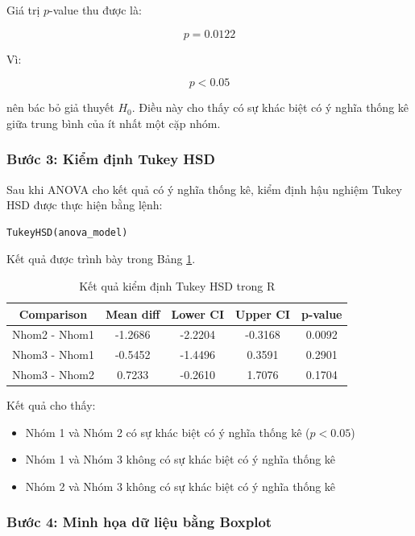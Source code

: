 Giá trị $p$-value thu được là:

\[
p = 0.0122
\]

Vì:

\[
p < 0.05
\]

nên bác bỏ giả thuyết $H_0$. Điều này cho thấy có sự khác biệt có ý nghĩa
thống kê giữa trung bình của ít nhất một cặp nhóm.

\subsubsection*{Bước 3: Kiểm định Tukey HSD}

Sau khi ANOVA cho kết quả có ý nghĩa thống kê, kiểm định hậu nghiệm
Tukey HSD được thực hiện bằng lệnh:

\begin{verbatim}
TukeyHSD(anova_model)
\end{verbatim}

Kết quả được trình bày trong Bảng \ref{tab:r_tukey}.

\begin{table}[!htp]
\centering
\caption{Kết quả kiểm định Tukey HSD trong R}
\label{tab:r_tukey}
\begin{tabular}{|c|c|c|c|c|}
\hline
Comparison & Mean diff & Lower CI & Upper CI & p-value \\
\hline
Nhom2 - Nhom1 & -1.2686 & -2.2204 & -0.3168 & 0.0092 \\
Nhom3 - Nhom1 & -0.5452 & -1.4496 & 0.3591 & 0.2901 \\
Nhom3 - Nhom2 & 0.7233 & -0.2610 & 1.7076 & 0.1704 \\
\hline
\end{tabular}
\end{table}

Kết quả cho thấy:

\begin{itemize}
\item Nhóm 1 và Nhóm 2 có sự khác biệt có ý nghĩa thống kê ($p < 0.05$)
\item Nhóm 1 và Nhóm 3 không có sự khác biệt có ý nghĩa thống kê
\item Nhóm 2 và Nhóm 3 không có sự khác biệt có ý nghĩa thống kê
\end{itemize}

\subsubsection*{Bước 4: Minh họa dữ liệu bằng Boxplot}

